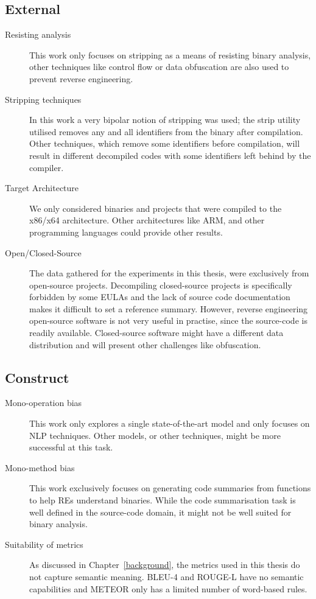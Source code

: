 \subsection{External}
    \begin{description}
        \item[Resisting analysis] This work only focuses on stripping as a means of resisting binary analysis, other techniques like control flow or data obfuscation are also used to prevent reverse engineering. 
        \item[Stripping techniques] In this work a very bipolar notion of stripping was used; the strip utility utilised removes any and all identifiers from the binary after compilation. Other techniques, which remove some identifiers before compilation, will result in different decompiled codes with some identifiers left behind by the compiler. 
        \item[Target Architecture] We only considered binaries and projects that were compiled to the x86/x64 architecture. Other architectures like ARM, and other programming languages could provide other results. 
        \item[Open/Closed-Source] The data gathered for the experiments in this thesis, were exclusively from open-source projects. Decompiling closed-source projects is specifically forbidden by some EULAs and the lack of source code documentation makes it difficult to set a reference summary. However, reverse engineering open-source software is not very useful in practise, since the source-code is readily available. Closed-source software might have a different data distribution and will present other challenges like obfuscation.
    \end{description}
\subsection{Construct}
    \begin{description}
        \item[Mono-operation bias] This work only explores a single state-of-the-art model and only focuses on NLP techniques. Other models, or other techniques, might be more successful at this task.
        \item[Mono-method bias] This work exclusively focuses on generating code summaries from functions to help REs understand binaries. While the code summarisation task is well defined in the source-code domain, it might not be well suited for binary analysis.
        \item[Suitability of metrics] As discussed in Chapter~\ref{background}, the metrics used in this thesis do not capture semantic meaning. BLEU-4 and ROUGE-L have no semantic capabilities and METEOR only has a limited number of word-based rules.
    \end{description}


